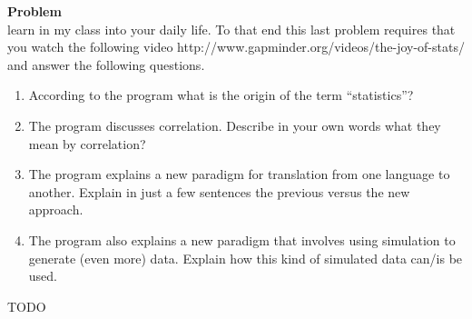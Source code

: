 \documentclass[12pt]{article}
\newenvironment{Ex}{\textbf{Problem}\vspace{.75em}\\}{}
\begin{document}
\begin{enumerate}
\begin{Ex}
    learn in my class into your daily life. To that end this last
    problem requires that you watch the following video
    http://www.gapminder.org/videos/the-joy-of-stats/ and answer the
    following questions.
    \begin{enumerate}
    \item According to the program what is the origin of the term
      ``statistics''?
    \item The program discusses correlation. Describe in your own
      words what they mean by correlation?
    \item The program explains a new paradigm for translation from one
      language to another. Explain in just a few sentences the
      previous versus the new approach.
    \item The program also explains a new paradigm that involves using
      simulation to generate (even more) data. Explain how this kind
      of simulated data can/is be used.
    \end{enumerate}
    \begin{solution} \hfill
      {\huge TODO}
    \end{solution}
  \end{Ex}
\end{enumerate}
\end{document}

